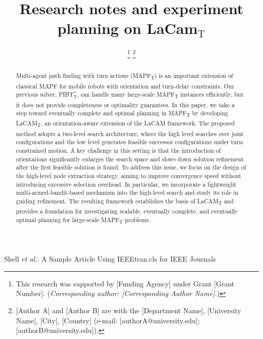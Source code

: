 \documentclass[lettersize,journal]{IEEEtran}
\begin{document}
\title{Research notes and experiment planning on LaCam$_{\text{T}}$}

\author{
\thanks{This research was supported by [Funding Agency] under Grant [Grant Number]. (\textit{Corresponding author: [Corresponding Author Name].})}
\thanks{[Author A] and [Author B] are with the [Department Name], [University Name], [City], [Country] (e-mail: [authorA@university.edu]; [authorB@university.edu]).}
}

%
{Shell \MakeLowercase{\textit{et al.}}: A Sample Article Using IEEEtran.cls for IEEE Journals}


\maketitle
\pagestyle{empty}  %
\thispagestyle{empty} %

\begin{abstract}
Multi-agent path finding with turn actions (MAPF\textsubscript{T}) is an important extension of classical MAPF for mobile robots with orientation and turn-delay constraints. Our previous solver, PIBT$^{\text{*}}_{\text{T}}$, can handle many large-scale MAPF\textsubscript{T} instances efficiently, but it does not provide completeness or optimality guarantees. In this paper, we take a step toward eventually complete and optimal planning in MAPF\textsubscript{T} by developing LaCAM\textsubscript{T}, an orientation-aware extension of the LaCAM framework. The proposed method adopts a two-level search architecture, where the high level searches over joint configurations and the low level generates feasible successor configurations under turn-constrained motion. A key challenge in this setting is that the introduction of orientations significantly enlarges the search space and slows down solution refinement after the first feasible solution is found. To address this issue, we focus on the design of the high-level node extraction strategy, aiming to improve convergence speed without introducing excessive selection overhead. In particular, we incorporate a lightweight multi-armed-bandit-based mechanism into the high-level search and study its role in guiding refinement. The resulting framework establishes the basis of LaCAM\textsubscript{T} and provides a foundation for investigating scalable, eventually complete, and eventually optimal planning for large-scale MAPF\textsubscript{T} problems.
\end{abstract}
\end{document}
